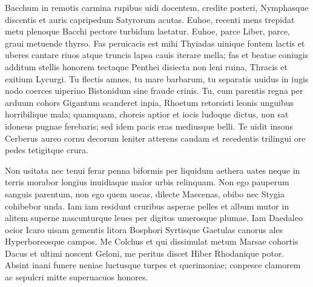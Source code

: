 \documentclass{book}
\newenvironment {carmen} [1] [\relax] 
  {\Titulus \Versus \incipit*\numerus{1}#1}
  {\endVersus}
\newcommand {\Alcaic}    {\Forma \strophae {0 \poena 01 \poena 2}}
\begin{document}
\begin{carmen}[\Alcaic]


Bacchum in remotis carmina rupibus
 uidi docentem, credite posteri,
      Nymphasque discentis et auris
      capripedum Satyrorum acutas. 
Euhoe, recenti mens trepidat metu               
 plenoque Bacchi pectore turbidum
      laetatur. Euhoe, parce Liber,
      parce, graui metuende thyrso. 
Fas peruicacis est mihi Thyiadas
 uinique fontem lactis et uberes               
      cantare riuos atque truncis
      lapsa cauis iterare mella; 
fas et beatae coniugis additum
 stellis honorem tectaque Penthei
      disiecta non leni ruina,               
      Thracis et exitium Lycurgi. 
Tu flectis amnes, tu mare barbarum,
 tu separatis uuidus in iugis
      nodo coerces uiperino
      Bistonidum sine fraude crinis.                
Tu, cum parentis regna per arduum
 cohors Gigantum scanderet inpia,
      Rhoetum retorsisti leonis
      unguibus horribilique mala; 
quamquam, choreis aptior et iocis               
 ludoque dictus, non sat idoneus
      pugnae ferebaris; sed idem
      pacis eras mediusque belli. 
Te uidit insons Cerberus aureo
 cornu decorum leniter atterens               
      caudam et recedentis trilingui
      ore pedes tetigitque crura. 

\end{carmen}

\begin{carmen}[\Alcaic]


Non usitata nec tenui ferar
 penna biformis per liquidum aethera
      uates neque in terris morabor
      longius inuidiaque maior 
urbis relinquam. Non ego pauperum                
sanguis parentum, non ego quem uocas,
      dilecte Maecenas, obibo
      nec Stygia cohibebor unda. 
Iam iam residunt cruribus asperae
 pelles et album mutor in alitem               
      superne nascunturque leues
      per digitos umerosque plumae. 
Iam Daedaleo ocior Icaro
 uisam gementis litora Bosphori
      Syrtisque Gaetulas canorus               
      ales Hyperboreosque campos. 
Me Colchus et qui dissimulat metum
 Marsae cohortis Dacus et ultimi
      noscent Geloni, me peritus
      discet Hiber Rhodanique potor.                
Absint inani funere neniae
 luctusque turpes et querimoniae;
      conpesce clamorem ac sepulcri
      mitte superuacuos honores.

\end{carmen} 

 
\desinitLiber

\Liber
\end{document}
